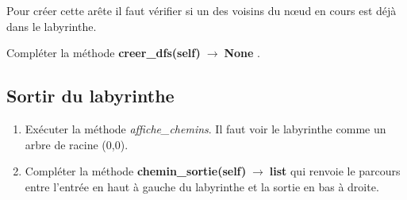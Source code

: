 \documentclass[a4paper,11pt]{article}
\begin{document}
\begin{Form}
\begin{center}
\label{e5}
\end{center}
\begin{center}
\label{e6}
\end{center}
Pour créer cette arête il faut vérifier si un des voisins du nœud en cours est déjà dans le labyrinthe.
\begin{activite}
Compléter la méthode \textbf{creer\_dfs(self)$\;\rightarrow\;$None} .
\end{activite}
\subsection{Sortir du labyrinthe}
\begin{activite}
\begin{enumerate}
\item Exécuter la méthode \emph{affiche\_chemins}. Il faut voir le labyrinthe comme un arbre de racine (0,0).
\item Compléter la méthode \textbf{chemin\_sortie(self)$\;\rightarrow\;$list} qui renvoie le parcours entre l'entrée en haut à gauche du labyrinthe et la sortie en bas à droite.
\end{enumerate}
\end{activite}
\end{Form}
\end{document}
